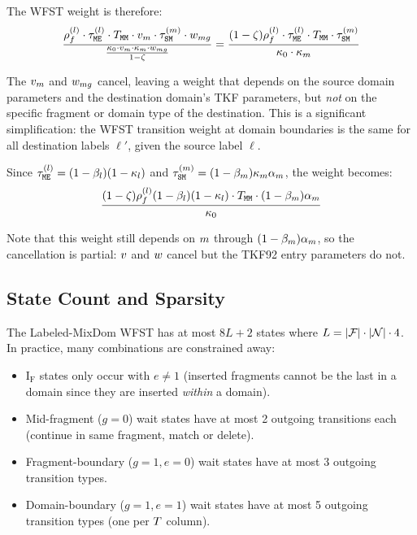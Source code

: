 The WFST weight is therefore:
\[
\frac{\rho^{(l)}_f \cdot \tau^{(l)}_{{\tt M}{\tt E}} \cdot
T_{{\tt M}{\tt M}} \cdot v_{m} \cdot
\tau^{(m)}_{{\tt S}{\tt M}} \cdot w_{mg}}
{\frac{\kappa_0 \cdot v_{m} \cdot \kappa_{m} \cdot w_{mg}}{1 - \zeta}}
= \frac{(1-\zeta)\rho^{(l)}_f \cdot \tau^{(l)}_{{\tt M}{\tt E}} \cdot
T_{{\tt M}{\tt M}} \cdot \tau^{(m)}_{{\tt S}{\tt M}}}
{\kappa_0 \cdot \kappa_{m}}
\]

The $v_{m}$ and $w_{mg}$ cancel, leaving a weight
that depends on the source domain parameters and the destination domain's TKF parameters,
but \emph{not} on the specific fragment or domain type of the destination.
This is a significant simplification: the WFST transition weight at domain boundaries
is the same for all destination labels $\ell'$, given the source label $\ell$.

Since $\tau^{(l)}_{{\tt M}{\tt E}} = (1-\beta_{l})(1-\kappa_{l})$
and $\tau^{(m)}_{{\tt S}{\tt M}} = (1-\beta_{m})\kappa_{m}\alpha_{m}$,
the weight becomes:
\[
\frac{(1-\zeta)\rho^{(l)}_f(1-\beta_{l})(1-\kappa_{l}) \cdot
T_{{\tt M}{\tt M}} \cdot (1-\beta_{m})\alpha_{m}}
{\kappa_0}
\]

Note that this weight still depends on $m$ through $(1-\beta_{m})\alpha_{m}$,
so the cancellation is partial: $v$ and $w$ cancel but the TKF92 entry
parameters do not.


\subsection{State Count and Sparsity}
\label{sec:state-count}

The Labeled-MixDom WFST has at most $8L + 2$ states where $L = |\mathcal{F}| \cdot |\mathcal{N}| \cdot 4$.
In practice, many combinations are constrained away:
\begin{itemize}
\item $\mathrm{I_F}$ states only occur with $e \neq 1$ (inserted fragments cannot be the last in a domain
  since they are inserted \emph{within} a domain).
\item Mid-fragment ($g=0$) wait states have at most 2 outgoing transitions each
  (continue in same fragment, match or delete).
\item Fragment-boundary ($g=1, e=0$) wait states have at most 3 outgoing transition types.
\item Domain-boundary ($g=1, e=1$) wait states have at most 5 outgoing transition types
  (one per $T$ column).
\end{itemize}

